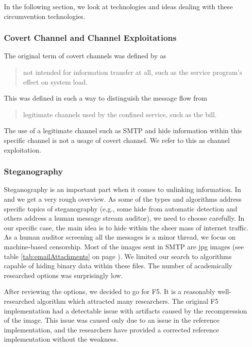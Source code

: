 In the following section, we look at technologies and ideas dealing with these circumvention technologies.

\subsubsection{Covert Channel and Channel Exploitations}
The original term of covert channels was defined by \citeauthor{Lampson73anote}\cite{Lampson73anote} as 

\begin{quote}
	not intended for information transfer at all, such as the service program's effect on system load.
\end{quote}

This was defined  in such a way to distinguish the message flow from 

\begin{quote}
	legitimate channels used by the confined service, such as the bill.
\end{quote}

The use of a legitimate channel such as SMTP and hide information within this specific channel is not a usage of covert channel. We refer to this as channel exploitation.

\subsubsection{Steganography}

Steganography is an important part when it comes to unlinking information. In \cite{6828087} and \cite{subhedar2014current} we get a very rough overview. As some of the types and algorithms address specific topics of steganography (e.g., some hide from automatic detection and others address a human message stream auditor), we need to choose carefully. In our specific case, the main idea is to hide within the sheer mass of internet traffic. As a human auditor screening all the messages is a minor thread, we focus on machine-based censorship. Most of the images sent in SMTP are jpg images (see table \ref{tab:emailAttachments} on page \pageref{tab:emailAttachments}). We limited our search to algorithms capable of hiding binary data within these files. The number of academically researched options was surprisingly low.

After reviewing the options, we decided to go for F5\cite{f5}. It is a reasonably well-researched algorithm which attracted many researchers. The original F5 implementation had a detectable issue with artifacts\cite{F5broken} caused by the recompression of the image. This issue was caused only due to an issue in the reference implementation, and the researchers have provided a corrected reference implementation without the weakness.

